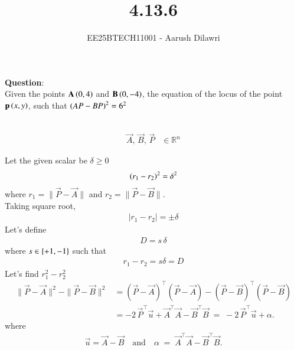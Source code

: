 \documentclass[journal]{IEEEtran}
\begin{document}

\vspace{3cm}

\title{4.13.6}
\author{EE25BTECH11001 - Aarush Dilawri}
\maketitle
{\let\newpage\relax\maketitle}

\renewcommand{\thefigure}{\theenumi}
\renewcommand{\thetable}{\theenumi}
\setlength{\intextsep}{10pt} %


\renewcommand{\thetable}{\theenumi}

\textbf{Question}:\\
Given the points $\mathbf{A} \left(0,4\right)$ and $\mathbf{B} \left(0,-4\right)$, the equation of the locus of the point $\mathbf{p}\left(x,y\right)$, such that $\left(AP - BP\right)^2 = 6^2$

\solution \\
\begin{align}
    \vec{A},\,\vec{B},\,\vec{P} &\in \mathbb{R}^n
\end{align}

Let the given scalar be $ \delta \ge 0 $ 
\begin{align}
    \left(r_1 -r_2\right)^2 = \delta^2
\end{align}
where $r_1=\|\vec{P}-\vec{A}\|$ and $r_2=\|\vec{P}-\vec{B}\|$.\\

Taking square root, 
\begin{align}
    \lvert r_1 - r_2 \rvert = \pm\delta
\end{align}
Let's define
\begin{align}
    D = s\,\delta
\end{align}
where $s\in \left\{+1,-1\right\}$ such that
\begin{align}
    r_1 -r_2 = s\delta = D
\end{align}
Let's find $r_1^2 -r_2^2$
\begin{align}
    \|\vec{P}-\vec{A}\|^2 - \|\vec{P}-\vec{B}\|^2
    &= (\vec{P}-\vec{A})^\top(\vec{P}-\vec{A}) - (\vec{P}-\vec{B})^\top(\vec{P}-\vec{B}) \\
    &= -2\,\vec{P}^\top\vec{u} + \vec{A}^\top\vec{A} - \vec{B}^\top\vec{B}
    \;=\; -2\,\vec{P}^\top\vec{u} + \alpha .
\end{align}
where
\begin{align}
    \vec{u} = \vec{A} -\vec{B} \quad \text{and} \quad  \alpha \;=\; \vec{A}^\top\vec{A} - \vec{B}^\top\vec{B}.
\end{align}
\end{document}
